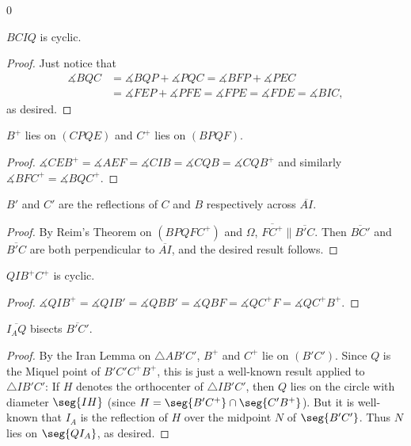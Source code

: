 \setcounter{claim}0
\begin{claim}
    $BCIQ$ is cyclic.
\end{claim}
\begin{proof}
    Just notice that
    \begin{align*}
        \measuredangle BQC&=\measuredangle BQP+\measuredangle PQC=\measuredangle BFP+\measuredangle PEC\\
        &=\measuredangle FEP+\measuredangle PFE=\measuredangle FPE=\measuredangle FDE=\measuredangle BIC,
    \end{align*}
    as desired.
\end{proof}
\begin{claim}
    $B^+$ lies on $(CPQE)$ and $C^+$ lies on $(BPQF)$.
\end{claim}
\begin{proof}
    $\measuredangle CEB^+=\measuredangle AEF=\measuredangle CIB=\measuredangle CQB=\measuredangle CQB^+$ and similarly $\measuredangle BFC^+=\measuredangle BQC^+$.
\end{proof}
\begin{claim}
    $B'$ and $C'$ are the reflections of $C$ and $B$ respectively across $\overline{AI}$.
\end{claim}
\begin{proof}
    By Reim's Theorem on $(BPQFC^+)$ and $\Omega$, $\overline{FC^+}\parallel\overline{B'C}$. Then $\overline{BC'}$ and $\overline{B'C}$ are both perpendicular to $\overline{AI}$, and the desired result follows.
\end{proof}
\begin{claim}
    $QIB^+C^+$ is cyclic.
\end{claim}
\begin{proof}
    $\measuredangle QIB^+=\measuredangle QIB'=\measuredangle QBB'=\measuredangle QBF=\measuredangle QC^+F=\measuredangle QC^+B^+$.
\end{proof}
\begin{claim}
    $\overline{I_AQ}$ bisects $\overline{B'C'}$.
\end{claim}
\begin{proof}
    By the Iran Lemma on $\triangle AB'C'$, $B^+$ and $C^+$ lie on $(B'C')$. Since $Q$ is the Miquel point of $B'C'C^+B^+$, this is just a well-known result applied to $\triangle IB'C'$: If $H$ denotes the orthocenter of $\triangle IB'C'$, then $Q$ lies on the circle with diameter $\seg{IH}$ (since $H=\seg{B'C^+}\cap\seg{C'B^+}$). But it is well-known that $I_A$ is the reflection of $H$ over the midpoint $N$ of $\seg{B'C'}$. Thus $N$ lies on $\seg{QI_A}$, as desired.
\end{proof}

